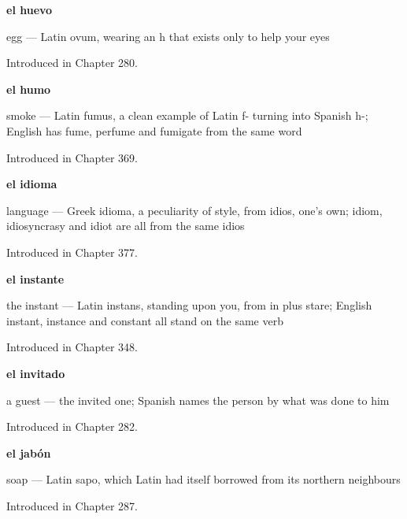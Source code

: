 \noindent\begin{minipage}[t]{\linewidth}
\raggedright
\textbf{el huevo}\par
\small egg — Latin ovum, wearing an h that exists only to help your eyes\par
\footnotesize Introduced in Chapter 280.
\end{minipage}\par\medskip

\noindent\begin{minipage}[t]{\linewidth}
\raggedright
\textbf{el humo}\par
\small smoke — Latin fumus, a clean example of Latin f- turning into Spanish h-; English has fume, perfume and fumigate from the same word\par
\footnotesize Introduced in Chapter 369.
\end{minipage}\par\medskip

\noindent\begin{minipage}[t]{\linewidth}
\raggedright
\textbf{el idioma}\par
\small language — Greek idioma, a peculiarity of style, from idios, one's own; idiom, idiosyncrasy and idiot are all from the same idios\par
\footnotesize Introduced in Chapter 377.
\end{minipage}\par\medskip

\noindent\begin{minipage}[t]{\linewidth}
\raggedright
\textbf{el instante}\par
\small the instant — Latin instans, standing upon you, from in plus stare; English instant, instance and constant all stand on the same verb\par
\footnotesize Introduced in Chapter 348.
\end{minipage}\par\medskip

\noindent\begin{minipage}[t]{\linewidth}
\raggedright
\textbf{el invitado}\par
\small a guest — the invited one; Spanish names the person by what was done to him\par
\footnotesize Introduced in Chapter 282.
\end{minipage}\par\medskip

\noindent\begin{minipage}[t]{\linewidth}
\raggedright
\textbf{el jabón}\par
\small soap — Latin sapo, which Latin had itself borrowed from its northern neighbours\par
\footnotesize Introduced in Chapter 287.
\end{minipage}\par\medskip

